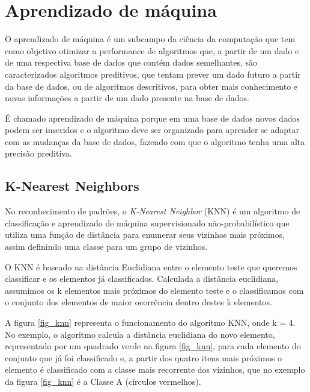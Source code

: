 \documentclass[
	12pt,				%
	openright,			%
	oneside,
	a4paper,			%
	english,			%
	french,				%
	spanish,			%
	brazil				%
	]{abntex2}
\begin{document}
\section{Aprendizado de máquina}
    
    O aprendizado de máquina é um subcampo da ciência da computação que tem como objetivo otimizar a performance de algoritmos que, a partir de um dado e de uma respectiva base de dados que contém dados semelhantes, são caracterizados algoritmos preditivos, que tentam prever um dado futuro a partir da base de dados, ou de algoritmos descritivos, para obter mais conhecimento e novas informações a partir de um dado presente na base de dados\cite{alpaydin2009introduction}. 
    
    É chamado aprendizado de máquina porque em uma base de dados novos dados podem ser inseridos e o algoritmo deve ser organizado para aprender se adaptar com as mudanças da base de dados, fazendo com que o algoritmo tenha uma alta precisão preditiva\cite{alpaydin2009introduction}.
    
\subsection{K-Nearest Neighbors}
    No reconhecimento de padrões, o \textit{K-Nearest Neighbor} (KNN) é um algoritmo de classificação e aprendizado de máquina supervisionado não-probabilístico que utiliza uma função de distância para enumerar seus vizinhos mais próximos, assim definindo uma classe para um grupo de vizinhos\cite{5408784}.
    
    O KNN é baseado na distância Euclidiana entre o elemento teste que queremos classificar e os elementos já classificados. Calculada a distância euclidiana, assumimos os k elementos mais próximos do elemento teste e o classificamos com o conjunto dos elementos de maior ocorrência dentro destes k elementos. 
    
    A figura \ref{fig_knn} representa o funcionamento do algoritmo KNN, onde k = 4. No exemplo, o algoritmo calcula a distância euclidiana do novo elemento, representado por um quadrado verde na figura \ref{fig_knn}, para cada elemento do conjunto que já foi classificado e, a partir dos quatro itens mais próximos o elemento é classificado com a classe mais recorrente dos vizinhos, que no exemplo da figura \ref{fig_knn} é a Classe A (círculos vermelhos).
    
\end{document}
